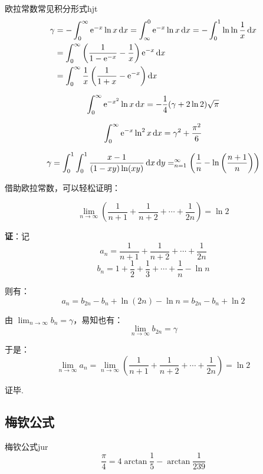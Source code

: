 \documentclass[12pt, cn]{elegantart}
\begin{document}
\begin{definition}{欧拉常数常见积分形式}{hjt}
	\begin{align*} 
	\gamma &=-\int_{0}^{\infty} \mathrm{e}^{-x} \ln x \mathop{}\!\mathrm{d} x=\int_{\infty}^{0} \mathrm{e}^{-x} \ln x \mathop{}\!\mathrm{d} x=-\int_{0}^{1} \ln \ln \frac{1}{x} \mathop{}\!\mathrm{d} x \\ &=\int_{0}^{\infty}\left(\frac{1}{1-\mathrm{e}^{-x}}-\frac{1}{x}\right) \mathrm{e}^{-x} \mathop{}\!\mathrm{d} x \\ &=\int_{0}^{\infty} \frac{1}{x}\left(\frac{1}{1+x}-\mathrm{e}^{-x}\right) \mathop{}\!\mathrm{d} x
	\end{align*}
	
	\begin{equation*}
		\int_{0}^{\infty} \mathrm{e}^{-x^{2}} \ln x \mathop{}\!\mathrm{d} x=-\frac{1}{4}(\gamma+2 \ln 2) \sqrt{\pi}
	\end{equation*}
	
	\begin{equation*}
		\int_{0}^{\infty} \mathrm{e}^{-x} \ln ^{2} x \mathop{}\!\mathrm{d} x=\gamma^{2}+\frac{\pi^{2}}{6}
	\end{equation*}
	
	\begin{equation*}
		\gamma=\int_{0}^{1} \int_{0}^{1} \frac{x-1}{(1-x y) \ln (x y)} \mathop{}\!\mathrm{d} x \mathop{}\!\mathrm{d} y=\relax_{n=1}^{\infty}\left(\frac{1}{n}-\ln\left( \frac{n+1}{n}\right)\right)
	\end{equation*}

	借助欧拉常数，可以轻松证明：
	
	$$\lim _{n \rightarrow \infty}\left(\frac{1}{n+1}+\frac{1}{n+2}+\cdots+\frac{1}{2 n}\right)=\ln 2$$

	\textbf{证}：记
	$$a_{n}=\frac{1}{n+1}+\frac{1}{n+2}+\cdots+\frac{1}{2 n}$$
	$$b_{n}=1+\frac{1}{2}+\frac{1}{3}+\cdots+\frac{1}{n} -\ln n$$
	
	则有：
	$$a_{n}=b_{2 n}-b_{n}+\ln (2 n)-\ln n=b_{2 n}-b_{n}+\ln 2$$
	
	由 $\displaystyle \lim_{n \rightarrow \infty} b_{n}=\gamma$，易知也有：
	$$\lim _{n \rightarrow \infty} b_{2 n}=\gamma$$
	
	于是：
	$$\lim _{n \rightarrow \infty} a_{n}=\lim _{n \rightarrow \infty}\left(\frac{1}{n+1}+\frac{1}{n+2}+\cdots+\frac{1}{2 n}\right)=\ln 2$$
	
	证毕.
\end{definition}


\subsection{梅钦公式}
\begin{theorem}{梅钦公式}{jur}
	\begin{equation}
		\frac{\pi}{4}=4 \arctan \frac{1}{5}-\arctan \frac{1}{239}
	\end{equation}
\end{theorem}
\end{document}
